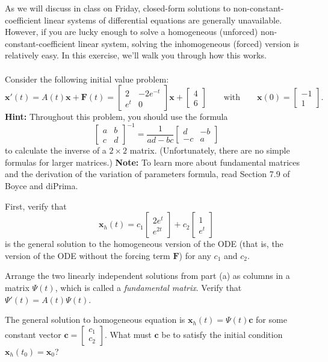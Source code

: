 \documentclass[boxes]{gsypset}
\newcommand{\m}[1]{\begin{bmatrix} #1 \end{bmatrix}}
\newcommand{\f}[2]{\frac{#1}{#2}}
\renewcommand{\bf}[1]{\mathbf{#1}}
\begin{document}
\begin{problem}
	As we will discuss in class on Friday, closed-form solutions to
	non-constant-coefficient linear systems of differential equations
	are generally unavailable.  However, if you are lucky enough to
	solve a homogeneous (unforced) non-constant-coefficient linear
	system, solving the inhomogeneous (forced) version is relatively
	easy.  In this exercise, we'll walk you through how this works.\\\\
	Consider the following initial value problem:
	\[
		\bf{x}'(t)=A(t)\bf{x}+\bf{F}(t)=\m{2&-2e^{-t}\\e^{t}&0}\bf{x}
		+\m{4\\6}\qquad\text{with}\qquad\bf{x}(0)=\m{-1\\1}.
	\]
	\textbf{Hint:} Throughout this problem, you should use the formula
	\[
		\m{a&b\\c&d}^{-1}=\f{1}{ad-bc}\m{d&-b\\-c&a}
	\]
	to calculate the inverse of a $2\times2$ matrix. (Unfortunately,
	there are no simple formulas for larger matrices.)
	\textbf{Note:} To learn more about fundamental matrices and the
	derivation of the variation of parameters formula, read Section
	7.9 of Boyce and diPrima.
	\begin{subproblems}
		\subproblem First, verify that
			\[
				\bf{x}_h(t)=c_1\m{2e^{t}\\e^{2t}}+c_2\m{1\\e^{t}}
			\]
			is the general solution to the homogeneous version of the ODE
			(that is, the version of the ODE without the forcing term
			$\bf{F}$) for any $c_1$ and $c_2$.
			\begin{solution}
				
			\end{solution}
		\subproblem Arrange the two linearly independent solutions from part
			(a) as columns in a matrix $\Psi(t)$, which is called a
			\textit{fundamental matrix}. Verify that
			$\Psi'(t)=A(t)\Psi(t)$.
			\begin{solution}
				
			\end{solution}
		\subproblem The general solution to homogeneous equation is
			$\bf{x}_h(t)=\Psi(t)\bf{c}$ for some constant vector
			$\bf{c}=\m{c_1\\c_2}$. What must $\bf{c}$ be to satisfy the
			initial condition $\bf{x}_h(t_0)=\bf{x}_0$?
			\begin{solution}
				

\end{solution}
\end{subproblems}
\end{problem}
\end{document}
